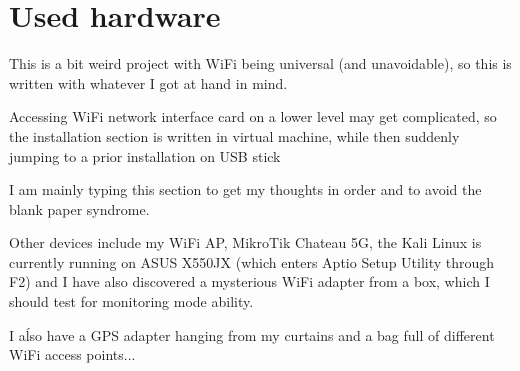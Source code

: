 \documentclass[../wifi-security.tex]{subfiles}
\begin{document}
\chapter{Used hardware}

This is a bit weird project with WiFi being universal (and unavoidable), so this is written with whatever I got at hand in mind.

Accessing WiFi network interface card on a lower level may get complicated, so the installation section is written in virtual machine, while then suddenly jumping to a prior installation on USB stick

I am mainly typing this section to get my thoughts in order and to avoid the blank paper syndrome.

Other devices include my WiFi AP, MikroTik Chateau 5G, the Kali Linux is currently running on ASUS X550JX (which enters Aptio Setup Utility through F2) and I have also discovered a mysterious WiFi adapter from a box, which I should test for monitoring mode ability.

I aĺso have a GPS adapter hanging from my curtains and a bag full of different WiFi access points...
\end{document}
